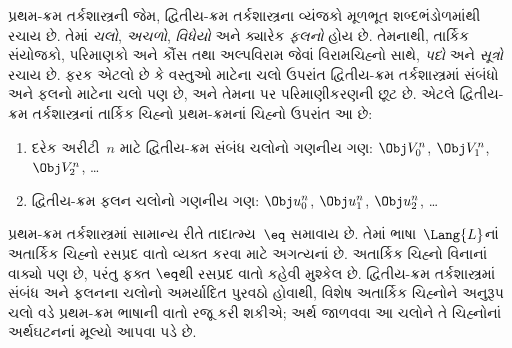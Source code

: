 
\label{guunit:OLP-0716}


પ્રથમ-ક્રમ તર્કશાસ્ત્રની જેમ, દ્વિતીય-ક્રમ તર્કશાસ્ત્રના
વ્યંજકો મૂળભૂત શબ્દભંડોળમાંથી રચાય છે. તેમાં
\emph{ચલો}, \emph{અચળો},
\emph{વિધેયો} અને ક્યારેક \emph{ફલનો}
હોય છે. તેમનાથી, તાર્કિક સંયોજકો, પરિમાણકો અને કૌંસ તથા
અલ્પવિરામ જેવાં વિરામચિહ્નો સાથે, \emph{પદો} અને
\emph{સૂત્રો} રચાય છે.
ફરક એટલો છે કે વસ્તુઓ માટેના ચલો ઉપરાંત દ્વિતીય-ક્રમ
તર્કશાસ્ત્રમાં સંબંધો અને ફલનો માટેના ચલો પણ છે,
અને તેમના પર પરિમાણીકરણની છૂટ છે.
એટલે દ્વિતીય-ક્રમ તર્કશાસ્ત્રનાં તાર્કિક ચિહ્નો
પ્રથમ-ક્રમનાં ચિહ્નો ઉપરાંત આ છે:

\begin{enumerate}
\item દરેક અરીટી~$n$ માટે દ્વિતીય-ક્રમ સંબંધ
ચલોનો ગણનીય ગણ:
$\Obj V_0^n$, $\Obj V_1^n$, $\Obj V_2^n$, \dots
\item દ્વિતીય-ક્રમ ફલન ચલોનો ગણનીય ગણ:
$\Obj u_0^n$, $\Obj u_1^n$, $\Obj u_2^n$, \dots
\end{enumerate}

પ્રથમ-ક્રમ તર્કશાસ્ત્રમાં સામાન્ય રીતે તાદાત્મ્ય~$\eq$
સમાવાય છે. તેમાં ભાષા~$\Lang{L}$નાં અતાર્કિક ચિહ્નો
રસપ્રદ વાતો વ્યક્ત કરવા માટે અગત્યનાં છે.
અતાર્કિક ચિહ્નો વિનાનાં વાક્યો પણ છે,
પરંતુ ફક્ત $\eq$થી રસપ્રદ વાતો કહેવી મુશ્કેલ છે.
દ્વિતીય-ક્રમ તર્કશાસ્ત્રમાં સંબંધ અને ફલનના ચલોનો અમર્યાદિત
પુરવઠો હોવાથી, વિશેષ અતાર્કિક ચિહ્નોને અનુરૂપ ચલો વડે
પ્રથમ-ક્રમ ભાષાની વાતો રજૂ કરી શકીએ;
અર્થ જાળવવા આ ચલોને તે ચિહ્નોનાં અર્થઘટનનાં મૂલ્યો આપવા પડે છે.
\endgroup
\endgroup


\begingroup
\makeatletter{}\makeatother

\label{guunit:OLP-0330}


\begingroup
\makeatletter{}\makeatother


